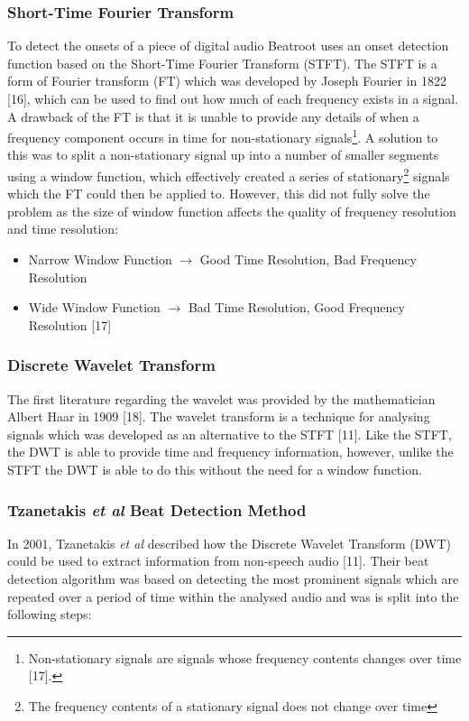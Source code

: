 \documentclass[a4paper, 11pt]{article}
\begin{document}
\subsubsection{Short-Time Fourier Transform}
To detect the onsets of a piece of digital audio Beatroot uses an onset detection function based on the Short-Time Fourier Transform (STFT). The STFT is a form of Fourier transform (FT) which was developed by Joseph Fourier in 1822 [16], which can be used to find out how much of each frequency exists in a signal. A drawback of the FT is that it is unable to provide any details of when a frequency component occurs in time for non-stationary signals\footnote{Non-stationary signals are signals whose frequency contents changes over time [17].}. A solution to this was to split a non-stationary signal up into a number of smaller segments using a window function, which effectively created a series of stationary\footnote{The frequency contents of a stationary signal does not change over time} signals which the FT could then be applied to. However, this did not fully solve the problem as the size of window function affects the quality of frequency resolution and time resolution:
\begin{itemize}
\item Narrow Window Function $\longrightarrow$  Good Time Resolution, Bad Frequency Resolution
\item Wide Window Function $\longrightarrow$  Bad Time Resolution, Good Frequency Resolution [17]
\end{itemize}

\subsubsection{Discrete Wavelet Transform}
The first literature regarding the wavelet was provided by the mathematician Albert Haar in 1909 [18]. The wavelet transform is a technique for analysing signals which was developed as an alternative to the STFT [11]. Like the STFT, the DWT is able to provide time and frequency information, however, unlike the STFT the DWT is able to do this without the need for a window function. 

\subsubsection{Tzanetakis \textit{et al} Beat Detection Method}
In 2001, Tzanetakis \textit{et al} described how the Discrete Wavelet Transform (DWT) could be used to extract information from non-speech audio [11]. Their beat detection algorithm was based on detecting the most prominent signals which are repeated over a period of time within the analysed audio and was is split into the following steps: 
\end{document}

